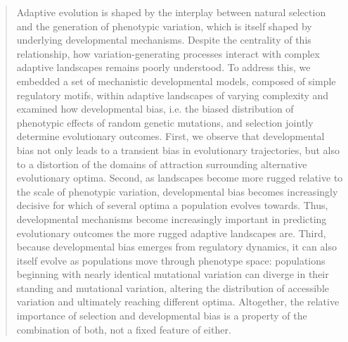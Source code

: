 \begin{abstract}

Adaptive evolution is shaped by the interplay between natural selection and the generation of phenotypic variation, which is itself shaped by underlying developmental mechanisms.
Despite the centrality of this relationship, how variation-generating processes interact with complex adaptive landscapes remains poorly understood.
To address this, we embedded a set of mechanistic developmental models, composed of simple regulatory motifs, within adaptive landscapes of varying complexity and examined how developmental bias, i.e. the biased distribution of phenotypic effects of random genetic mutations, and selection jointly determine evolutionary outcomes.
First, we observe that developmental bias not only leads to a transient bias in evolutionary trajectories, but also to a distortion of the domains of attraction surrounding alternative evolutionary optima.
Second, as landscapes become more rugged relative to the scale of phenotypic variation, developmental bias becomes increasingly decisive for which of several optima a population evolves towards.
Thus, developmental mechanisms become increasingly important in predicting evolutionary outcomes the more rugged adaptive landscapes are.
Third, because developmental bias emerges from regulatory dynamics, it can also itself evolve as populations move through phenotype space: populations beginning with nearly identical mutational variation can diverge in their standing and mutational variation, altering the distribution of accessible variation and ultimately reaching different optima.
Altogether, the relative importance of selection and developmental bias is a property of the combination of both, not a fixed feature of either.


\end{abstract}
